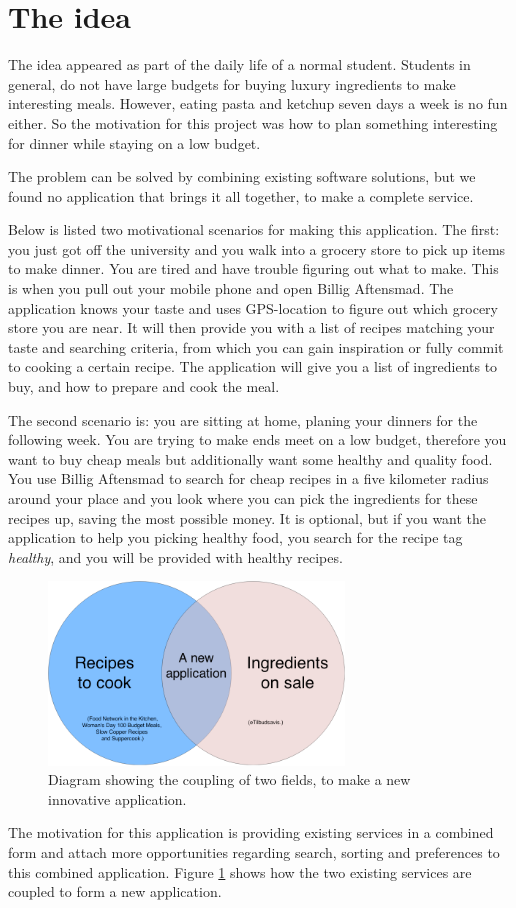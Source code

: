 \section{The idea}
\label{sec:theidea}

The idea appeared as part of the daily life of a normal student. Students in general, do not have large budgets for buying luxury ingredients to make interesting meals. However, eating pasta and ketchup seven days a week is no fun either. So the motivation for this project was how to plan something interesting for dinner while staying on a low budget. 

The problem can be solved by combining existing software solutions, but we found no application that brings it all together, to make a complete service.

Below is listed two motivational scenarios for making this application. The first: you just got off the university and you walk into a grocery store to pick up items to make dinner. You are tired and have trouble figuring out what to make. This is when you pull out your mobile phone and open Billig Aftensmad. The application knows your taste and uses GPS-location to figure out which grocery store you are near. It will then provide you with a list of recipes matching your taste and searching criteria, from which you can gain inspiration or fully commit to cooking a certain recipe. The application will give you a list of ingredients to buy, and how to prepare and cook the meal.

The second scenario is: you are sitting at home, planing your dinners for the following week. You are trying to make ends meet on a low budget, therefore you want to buy cheap meals but additionally want some healthy and quality food. You use Billig Aftensmad to search for cheap recipes in a five kilometer radius around your place and you look where you can pick the ingredients for these recipes up, saving the most possible money. It is optional, but if you want the application to help you picking healthy food, you search for the recipe tag \textit{healthy}, and you will be provided with healthy recipes.

\begin{figure}[H]
	\centering
	\includegraphics[width=0.7\textwidth]{Pictures/theideadiagram.png}
	\caption{Diagram showing the coupling of two fields, to make a new innovative application.}
	\label{fig:theideaasdiagram}
\end{figure}

The motivation for this application is providing existing services in a combined form and attach more opportunities regarding search, sorting and preferences to this combined application. Figure \ref{fig:theideaasdiagram} shows how the two existing services are coupled to form a new application.
